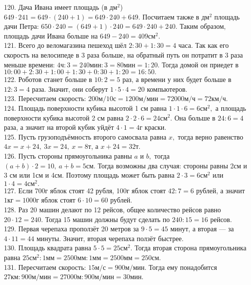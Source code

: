 120. Дача Ивана имеет площадь (в $\text{дм}^2$) $649\cdot241=649\cdot(240+1)=649\cdot240+649.$ Посчитаем также в $\text{дм}^2$ площадь дачи Петра:
$650\cdot240=(649+1)\cdot240=649\cdot240+240.$ Таким образом, площадь дачи Ивана больше на $649-240=409\text{см}^2.$\\
121. Всего до веломагазина пешеход шёл $2:30+1:30=4$ часа. Так как его скорость на велосипеде в 3 раза больше, на обратный путь он потратит в 3 раза меньше времени: $4\text{ч}:3=240\text{мин}:3=80\text{мин}=1:20.$ Тогда домой он приедет в $10:00+2:30+1:00+1:30+0:30+1:20=16:50.$\\
122. Роботов станет больше в $10:2=5$ раз, а времени у них будет больше в $12:3=4$ раза. Значит, они соберут $1\cdot5\cdot4=20$ компьютеров.\\
123. Пересчитаем скорость: $200\text{м}/10\text{с}=1200\text{м}/\text{мин}=72000\text{м}/\text{ч}=72\text{км}/\text{ч}.$\\
124. Площадь поверхности кубика высотой 1 см равна $1\cdot1\cdot6=6\text{см}^2,$ а площадь поверхности кубика высотой 2 см равна $2\cdot2\cdot6=24\text{см}^2.$ Она больше в $24:6=4$ раза, а значит на второй кубик уйдёт $4\cdot1=4$г краски.\\
125. Пусть грузоподъёмность второго самосвала равна $x,$ тогда верно равенство $4x=x+24,\ 3x=24,\ x=8$т, а $x+24=32$т.\\
126. Пусть стороны прямоугольника равны $a$ и $b,$ тогда $(a+b)\cdot2=10,\ a+b=5$см. Тогда возможны два случая: стороны равны 2см и 3 см или 1см и 4см. Поэтому площадь может быть равна $2\cdot3=6\text{см}^2$ или $1\cdot4=4\text{см}^2.$\\
127. Если 700г яблок стоят 42 рубля, 100г яблок стоят $42:7=6$ рублей, а значит $1\text{кг}=1000$г яблок стоят $6\cdot10=60$ рублей.\\
128. Раз 20 машин делают по 12 рейсов, общее количество рейсов равно $20\cdot12=240.$ Тогда 15 машин должны будут сделать по $240:15=16$ рейсов.\\
129. Первая черепаха проползёт 20 метров за $9\cdot5=45$ минут, а вторая --- за $4\cdot11=44$ минуты. Значит, вторая черепаха ползёт быстрее.\\
130. Площадь квадрата равна $5\cdot5=25\text{см}^2.$ Тогда вторая сторона прямоугольника равна $25\text{см}^2:1\text{мм}=2500\text{мм}:1\text{мм}=2500\text{мм}=250\text{см}.$\\
131. Пересчитаем скорость: $15\text{м}/\text{с}=900\text{м}/\text{мин}.$ Тогда ему понадобится $27\text{км}:900\text{м}/\text{мин}=
27000\text{м}:900\text{м}/\text{мин}=30$мин.\\
